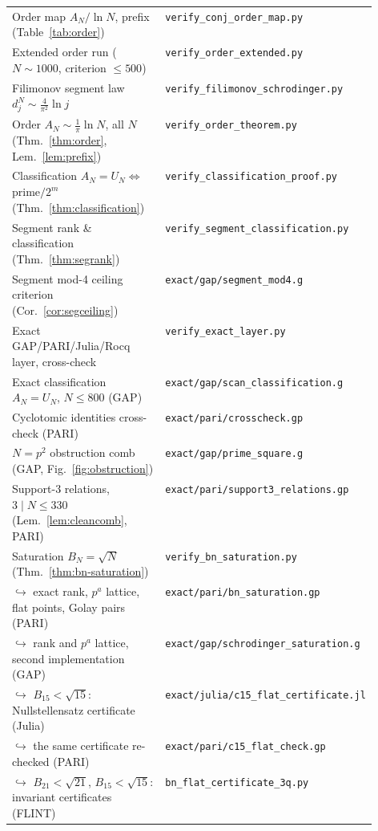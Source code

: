 \begin{longtable}{@{}p{0.53\linewidth}@{\hspace{0.6em}}l@{}}
Order map $A_N/\ln N$, prefix (Table~\ref{tab:order}) & \texttt{verify\_conj\_order\_map.py}\\
Extended order run ($N\!\sim\!1000$, criterion $\le500$) & \texttt{verify\_order\_extended.py}\\
Filimonov segment law $d_j^N\!\sim\!\tfrac4{\pi^2}\ln j$ & \texttt{verify\_filimonov\_schrodinger.py}\\
Order $A_N\!\sim\!\tfrac1\pi\ln N$, all $N$ (Thm.~\ref{thm:order}, Lem.~\ref{lem:prefix}) & \texttt{verify\_order\_theorem.py}\\
Classification $A_N{=}U_N\!\Leftrightarrow\!$ prime$/2^m$ (Thm.~\ref{thm:classification}) & \texttt{verify\_classification\_proof.py}\\
Segment rank \& classification (Thm.~\ref{thm:segrank}) & \texttt{verify\_segment\_classification.py}\\
Segment mod-4 ceiling criterion (Cor.~\ref{cor:segceiling}) & \texttt{exact/gap/segment\_mod4.g}\\
Exact GAP/PARI/Julia/Rocq layer, cross-check & \texttt{verify\_exact\_layer.py}\\
Exact classification $A_N{=}U_N$, $N\le800$ (GAP) & \texttt{exact/gap/scan\_classification.g}\\
Cyclotomic identities cross-check (PARI) & \texttt{exact/pari/crosscheck.gp}\\
$N{=}p^2$ obstruction comb (GAP, Fig.~\ref{fig:obstruction}) & \texttt{exact/gap/prime\_square.g}\\
Support-$3$ relations, $3\mid N\le330$ (Lem.~\ref{lem:cleancomb}, PARI) & \texttt{exact/pari/support3\_relations.gp}\\
Saturation $B_N{=}\sqrt N$ (Thm.~\ref{thm:bn-saturation}) & \texttt{verify\_bn\_saturation.py}\\
\quad$\hookrightarrow$ exact rank, $p^a$ lattice, flat points, Golay pairs (PARI) & \texttt{exact/pari/bn\_saturation.gp}\\
\quad$\hookrightarrow$ rank and $p^a$ lattice, second implementation (GAP) & \texttt{exact/gap/schrodinger\_saturation.g}\\
\quad$\hookrightarrow$ $B_{15}<\sqrt{15}$: Nullstellensatz certificate (Julia) & \texttt{exact/julia/c15\_flat\_certificate.jl}\\
\quad$\hookrightarrow$ the same certificate re-checked (PARI) & \texttt{exact/pari/c15\_flat\_check.gp}\\
\quad$\hookrightarrow$ $B_{21}<\sqrt{21}$, $B_{15}<\sqrt{15}$: invariant certificates (FLINT) & \texttt{bn\_flat\_certificate\_3q.py}\\

\end{longtable}
